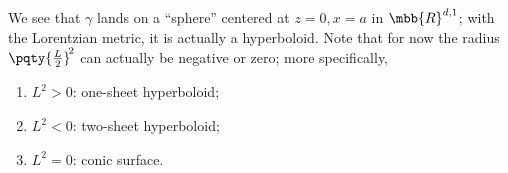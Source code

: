 \documentclass[a4paper,10pt]{article}
\begin{document}
	We see that $\gamma$ lands on a ``sphere'' centered at $z = 0, x = a$ in $\mbb{R}^{d,1}$; with the Lorentzian metric, it is actually a hyperboloid. Note that for now the radius $\pqty{\frac{L}{2}}^{\!2}$ can actually be negative or zero; more specifically,
	\begin{enumerate}[noitemsep]
	\item $L^2 > 0$: one-sheet hyperboloid;
	\item $L^2 < 0$: two-sheet hyperboloid;
	\item $L^2 = 0$: conic surface. 
	\end{enumerate}
	
	
	

\printbibliography[%
	,heading = bibintoc
]
\end{document}
